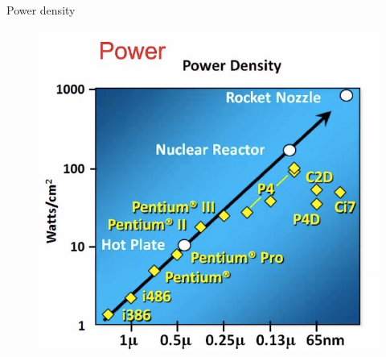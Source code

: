 \documentclass{beamer}
\begin{document}
\begin{frame}{Power density}
	\begin{figure}
		\includegraphics[scale=0.3]{Power_Density.jpg}
	\end{figure}
\end{frame}
\end{document}
